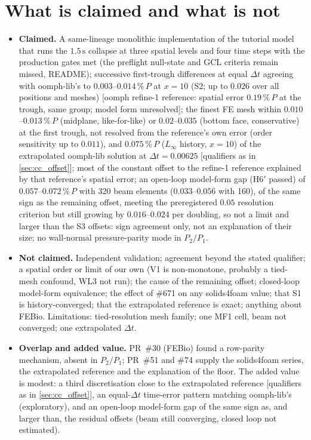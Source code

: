 \documentclass[sn-mathphys,Numbered]{sn-jnl}
\newcommand{\urefOne}{{\small[oomph refine-1 reference: spatial error $0.19\,\%\,P$ at the trough, same group; model form unresolved]}}
\newcommand{\uref}{{\small[qualifiers as in \ref{sec:cc_offset}]}}
\begin{document}
\section{What is claimed and what is not}\label{sec:cc_claims}
\begin{itemize}
\item \textbf{Claimed.} A same-lineage monolithic implementation of the tutorial model that runs the $1.5\,\mathrm s$ collapse at three spatial levels and four time steps with the production gates met (the preflight null-state and GCL criteria remain missed, README); successive first-trough differences at equal $\Delta t$ agreeing with oomph-lib's to $0.003$--$0.014\,\%\,P$ at $x=10$ (S2; up to $0.026$ over all positions and meshes) \urefOne; the finest FE mesh within $0.010$--$0.013\,\%\,P$ (midplane, like-for-like) or $0.02$--$0.035$ (bottom face, conservative) at the first trough, not resolved from the reference's own error (order sensitivity up to $0.011$), and $0.075\,\%\,P$ ($L_\infty$ history, $x=10$) of the extrapolated oomph-lib solution at $\Delta t=0.00625$ \uref; most of the constant offset to the refine-1 reference explained by that reference's spatial error; an open-loop model-form gap (H6$'$ passed) of $0.057$--$0.072\,\%\,P$ with 320 beam elements ($0.033$--$0.056$ with 160), of the same sign as the remaining offset, meeting the preregistered $0.05$ resolution criterion but still growing by $0.016$--$0.024$ per doubling, so not a limit and larger than the S3 offsets: sign agreement only, not an explanation of their size; no wall-normal pressure-parity mode in $P_2/P_1$.
\item \textbf{Not claimed.} Independent validation; agreement beyond the stated qualifier; a spatial order or limit of our own (V1 is non-monotone, probably a tied-mesh confound, WL3 not run); the cause of the remaining offset; closed-loop model-form equivalence; the effect of \#671 on any solids4foam value; that S1 is history-converged; that the extrapolated reference is exact; anything about FEBio. Limitations: tied-resolution mesh family; one MF1 cell, beam not converged; one extrapolated $\Delta t$.
\item \textbf{Overlap and added value.} PR~\#30 (FEBio) found a row-parity mechanism, absent in $P_2/P_1$; PR~\#51 and \#74 supply the solids4foam series, the extrapolated reference and the explanation of the floor. The added value is modest: a third discretisation close to the extrapolated reference \uref, an equal-$\Delta t$ time-error pattern matching oomph-lib's (exploratory), and an open-loop model-form gap of the same sign as, and larger than, the residual offsets (beam still converging, closed loop not estimated).
\end{itemize}
\end{document}
